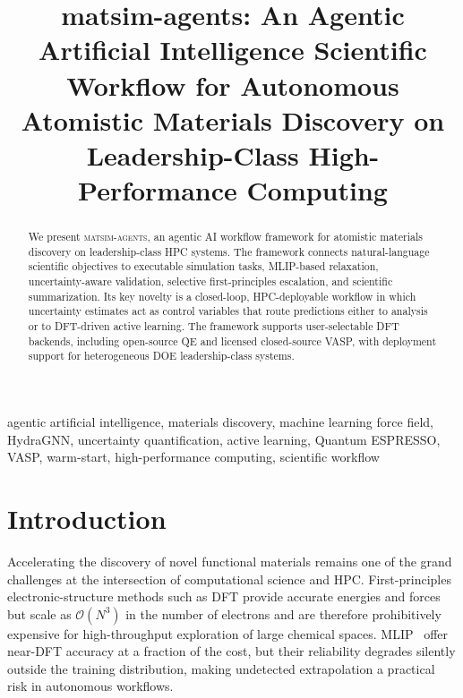 \documentclass[conference]{IEEEtran}
\def\ac#1{#1}%
\def\acs#1{#1}%
\def\Acp#1{#1}%
\begin{document}
\title{matsim-agents: An Agentic Artificial Intelligence Scientific Workflow for Autonomous
Atomistic Materials Discovery on Leadership-Class High-Performance Computing}

\author{
}

\maketitle

\begin{abstract}
We present \textsc{matsim-agents}, an agentic \ac{AI} workflow framework for
atomistic materials discovery on leadership-class \ac{HPC} systems. The framework connects natural-language scientific objectives to
executable simulation tasks, \ac{MLIP}-based relaxation, uncertainty-aware
validation, selective first-principles escalation, and scientific summarization.
Its key novelty is a closed-loop, \acs{HPC}-deployable workflow in which uncertainty
estimates act as control variables that route predictions either to analysis or
to \ac{DFT}-driven active learning. The framework supports user-selectable \ac{DFT} backends, including open-source \ac{QE} and licensed closed-source \ac{VASP}, with deployment support for heterogeneous \ac{DOE} leadership-class systems.
\end{abstract}

\begin{IEEEkeywords}
agentic artificial intelligence, materials discovery, machine learning force field, HydraGNN,
uncertainty quantification, active learning, Quantum ESPRESSO, VASP,
warm-start, high-performance computing, scientific workflow
\end{IEEEkeywords}

\section{Introduction}
\label{sec:intro}

Accelerating the discovery of novel functional materials remains one of the
grand challenges at the intersection of computational science and
\acs{HPC}. First-principles electronic-structure methods such
as \acs{DFT} provide accurate energies and forces but scale as $\mathcal{O}(N^3)$ in
the number of electrons and are therefore prohibitively expensive for
high-throughput exploration of large chemical spaces. \Acp{MLIP}~\cite{behler2007,bartok2010,batzner2022} offer
near-\acs{DFT} accuracy at a fraction of the cost, but their reliability degrades
silently outside the training distribution, making undetected extrapolation a
practical risk in autonomous workflows.
\end{document}

